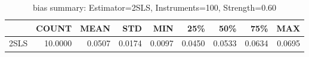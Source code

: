 \begin{table}[ht]
\centering
\caption{bias summary: Estimator=2SLS, Instruments=100, Strength=0.60}
\begin{tabular}{lrrrrrrrr}
\toprule
 & COUNT & MEAN & STD & MIN & 25\% & 50\% & 75\% & MAX \\
\midrule
2SLS & 10.0000 & 0.0507 & 0.0174 & 0.0097 & 0.0450 & 0.0533 & 0.0634 & 0.0695 \\
\bottomrule
\end{tabular}
\end{table}
